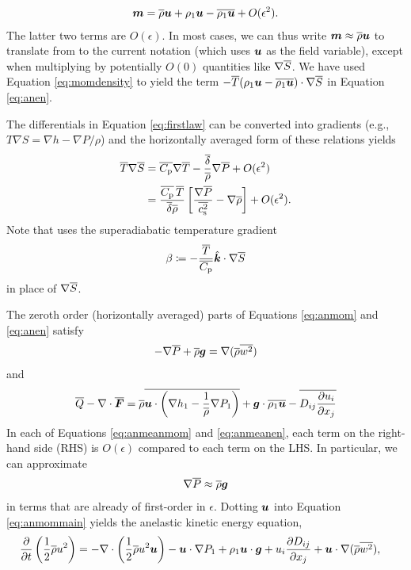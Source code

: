 \documentclass[12pt]{article}
\newcommand{\vecf}{\bm{F}}
\newcommand{\veck}{\hat{\bm{k}}}
\newcommand{\deltaref}{\overline{\delta}}
\newcommand{\cpref}{\overline{\cpcap}}
\newcommand{\cssqref}{\overline{\cs^2}}
\begin{document}
  \begin{align}\label{eq:momdensity}
  	\bm{m} = \overline{\rho}\bm{u} + \rho_1\bm{u} - \overline{\rho_1\bm{u}} + O(\epsilon^2).
  \end{align}
  The latter two terms are $O(\epsilon)$. In most cases, we can thus write $\bm{m} \approx \overline{\rho} \bm{u}$ to translate from \citet{Gough1969} to the current notation (which uses $\bm{u}$ as the field variable), except when multiplying by potentially $O(0)$ quantities like $\nabla\overline{S}$. We have used Equation \eqref{eq:momdensity} to yield the term $- \overline{T}(\rho_1\bm{u}-\overline{\rho_1\bm{u}})\cdot\nabla\overline{S}$ in Equation \eqref{eq:anen}. 
  
  The differentials in Equation \eqref{eq:firstlaw} can be converted into gradients (e.g., $T\nabla S= \nabla h - \nabla P/\rho$) and the horizontally averaged form of these relations yields 
  \begin{subequations}\label{eq:anfirstlaw}
  \begin{align}
  	\tmpref\nabla\sref &= \cpref\nabla\tmpref - \frac{\deltaref}{\rhoref}\nabla\prsref + O(\epsilon^2)\\
  	 &= \frac{\cpref\,\tmpref}{\deltaref\rhoref}\left[\frac{\nabla\prsref}{\cssqref}-\nabla\rhoref\right]+O(\epsilon^2).
  \end{align}
  \end{subequations}
  Note that \citet{Gough1969} uses the superadiabatic temperature gradient
  \begin{align}
  	\beta\define -\frac{\tmpref}{\cpref}\veck\dotgrad\sref
  \end{align}
  in place of $\nabla \overline{S}$. 
  
  The zeroth order (horizontally averaged) parts of Equations \eqref{eq:anmom} and \eqref{eq:anen} satisfy 
  \begin{align}\label{eq:anmeanmom}
  	-\nabla\overline{P} + \overline{\rho}\bm{g} = \nabla(\overline{\rho} \overline{w^2})
  \end{align}
  and
  \begin{align}\label{eq:anmeanen}
  	\qref - \Div\overline{\vecf} = \rhoref\overline{\vecu\cdot\left(\nabla h_1-\frac{1}{\rhoref}\nabla P_1\right)} + \vecg\cdot\overline{\rho_1\vecu} - \overline{D_{ij}\pderiv{u_i}{x_j}}
  \end{align}
  In each of Equations \eqref{eq:anmeanmom} and \eqref{eq:anmeanen}, each term on the right-hand side (RHS) is $O(\epsilon)$ compared to each term on the LHS. In particular, we can approximate 
  \begin{align}\label{eq:anhydrostatic}
  	\nabla\overline{P}\approx \overline{\rho}\bm{g}
  \end{align}
  in terms that are already of first-order in $\epsilon$. Dotting $\bm{u}$ into Equation \eqref{eq:anmommain} yields the anelastic kinetic energy equation,
	\begin{align}\label{eq:anke}
		\frac{\partial}{\partial t}\left(\frac{1}{2}\overline{\rho} u^2\right)&=-\nabla\cdot\left(\frac{1}{2}\overline{\rho} u^2\bm{u} \right) - \bm{u}\cdot\nabla P_1 + \rho_1\bm{u}\cdot\bm{g} + u_i\frac{\partial D_{ij}}{\partial x_j} + \bm{u}\cdot\nabla(\overline{\rho} \overline{w^2}),
	\end{align}
\end{document}
